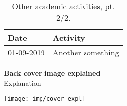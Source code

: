 \begin{appendices}
\begin{table}
\footnotesize
\begin{tabulary}{\linewidth}{LL}
  Date & Activity \\
  \hline
  \rule{0pt}{2.5ex}\mbox{01-09-2019} & Another something \\
  \hline
\end{tabulary}
\caption[Other academic activities, pt. 2/2]{Other academic activities, pt. 2/2.}
\label{table:appendix_activities_2}
\end{table}

\end{appendices}

\clearpage
\pagestyle{empty}

\noindent
\textbf{Back cover image explained}\\
Explanation

\texttt{[image: img/cover\_expl]}
